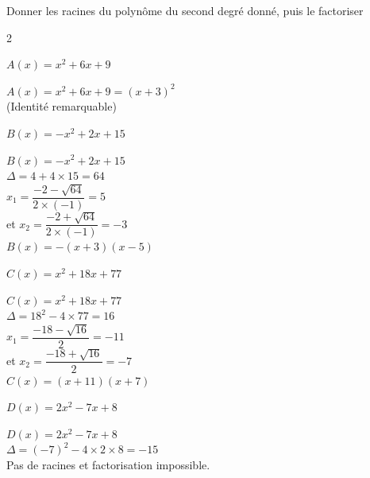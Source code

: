 \documentclass[12pt,a4paper]{article}  %
\begin{document}
\vspace{-0.3cm}

Donner les racines du polynôme du second degré donné, puis le factoriser
\begin{multicols}{2}
\begin{enumMet}
    \item {} $A(x)=x^{2}+6 x+9$\\
    \begin{corrBox}
        $A(x)=x^{2}+6 x+9=(x+3)^2$\\
        (Identité remarquable)
    \end{corrBox}
    \item $B(x)=-x^{2}+2 x+15$\\
    \begin{corrBox}
        $B(x)=-x^{2}+2 x+15$\\
        $\Delta=4+4\times15=64$\\
        $x_1=\dfrac{-2-\sqrt{64}}{2\times(-1)}=5$\\
        et $x_2=\dfrac{-2+\sqrt{64}}{2\times(-1)}=-3$\\
        $B(x)=-(x+3)(x-5)$
    \end{corrBox}
    
    \columnbreak
    \item $C(x)=x^{2}+18 x+77$\\
    \begin{corrBox}
        $C(x)=x^{2}+18 x+77$\\
        $\Delta=18^2-4\times77=16$\\
        $x_1=\dfrac{-18-\sqrt{16}}{2}=-11$\\
        et $x_2=\dfrac{-18+\sqrt{16}}{2}=-7$\\
        $C(x)=(x+11)(x+7)$
    \end{corrBox}
    \item $D(x)=2 x^{2}-7 x+8$\\
    \begin{corrBox}
        $D(x)=2 x^{2}-7 x+8$\\
        $\Delta=(-7)^2-4\times2\times8=-15$\\
        Pas de racines et factorisation impossible.
    \end{corrBox}
\end{enumMet}
\end{multicols}

\newpage
\vspace{-0.3cm}
\end{document}

